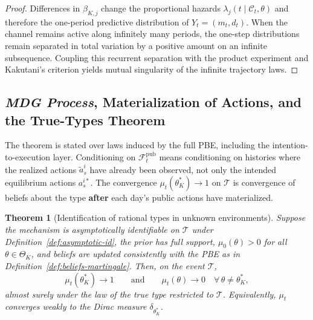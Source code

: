 \documentclass[12pt,a4paper]{article}
\theoremstyle{plain}
\newtheorem{theorem}{Theorem}[section]
\theoremstyle{definition}
\theoremstyle{remark}
\newcommand{\1}{\mathbf{1}}
\begin{document}
\begin{proof}
Differences in $\beta_{K,j}$ change the proportional hazards
$\lambda_j(t\mid\mathcal{C}_t,\theta)$ and therefore the one-period predictive
distribution of $Y_t=(m_t,d_t)$. When the channel remains active along infinitely many
periods, the one-step distributions remain separated in total variation by a positive
amount on an infinite subsequence. Coupling this recurrent separation with the product
experiment and Kakutani's criterion yields mutual singularity of the infinite
trajectory laws.
\end{proof}

\subsection{\textit{MDG Process}, Materialization of Actions, and the True-Types Theorem}
\label{subsec:mano-dios-asymptotic}

The theorem is stated over laws induced by the full PBE, including the
intention-to-execution layer. Conditioning on $\mathcal{F}_t^{\mathrm{pub}}$ means
conditioning on histories where the realized actions $\tilde{a}_s^i$ have already been
observed, not only the intended equilibrium actions $a_s^{i\ast}$. The convergence
$\mu_t(\theta_K^\ast)\to1$ on $\mathcal{T}$ is convergence of beliefs about the type
\textbf{after} each day's public actions have materialized.

\begin{theorem}[Identification of rational types in unknown environments]
\label{thm:posterior-consistency}
Suppose the mechanism is asymptotically identifiable on $\mathcal{T}$ under
Definition~\ref{def:asymptotic-id}, the prior has full support,
$\mu_0(\theta)>0$ for all $\theta\in\Theta_K$, and beliefs are updated consistently
with the PBE as in Definition~\ref{def:beliefs-martingale}. Then, on the event
$\mathcal{T}$,
\[
\mu_t(\theta_K^\ast)\longrightarrow 1
\qquad\text{and}\qquad
\mu_t(\theta)\longrightarrow0\quad\forall\,\theta\neq\theta_K^\ast,
\]
almost surely under the law of the true type restricted to $\mathcal{T}$. Equivalently,
$\mu_t$ converges weakly to the Dirac measure $\delta_{\theta_K^\ast}$.
\end{theorem}
\end{document}
